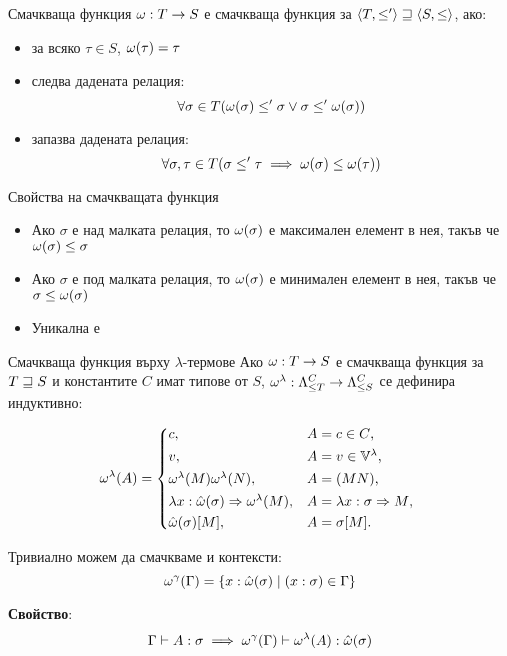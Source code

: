 \documentclass[9pt]{beamer}
\begin{document}
  \begin{frame}{Смачкваща функция}
    $\squash: T \fun S$ е смачкваща функция за
    $\lattice{ T}{ \less' } \tless \lattice{ S}{ \less }$, ако:
    \begin{itemize}
        \item за всяко $\tau \in S$, $\squash(\tau) = \tau$
        \item следва дадената релация:
            \[ \forall \sigma \in T
                (\squash(\sigma) \less' \sigma \lor \sigma \less' \squash(\sigma)) \]
        \item запазва дадената релация:
            \[ \forall \sigma, \tau \in T (\sigma \less' \tau \implies
                \squash(\sigma) \less \squash(\tau)) \]
    \end{itemize}
  \end{frame}

  \begin{frame}{Свойства на смачкващата функция}
    \begin{itemize}
      \item Ако $\sigma$ е над малката релация, то $\squash(\sigma)$ е максимален
        елемент в нея, такъв че $\squash(\sigma) \less \sigma$
      \item Ако $\sigma$ е под малката релация, то $\squash(\sigma)$ е минимален
        елемент в нея, такъв че $\sigma \less \squash(\sigma)$
      \item Уникална е
    \end{itemize}
  \end{frame}

  \begin{frame}{Смачкваща функция върху $\lambda$-термове}
    Ако $\squash: T \fun S$ е смачкваща функция за $T \tless S$ и
    константите $C$ имат типове от $S$,
    $\lsquash: \fancylambda{T}{C} \fun \fancylambda{S}{C}$
    се дефинира индуктивно:

    \[
        \lsquash(A) =
        \begin{cases*}
            c ,& $A = c \in C$, \\
            v ,& $A = v \in \lvars$, \\
            \lsquash(M) \lsquash(N) ,& $A = (MN)$, \\
            \lambda x : \tsquash(\sigma) \abstr \lsquash(M)
 ,& $A = \lambda x : \sigma \abstr M$, \\
                \tsquash(\sigma)[M] ,& $A = \sigma[M]$. \\
        \end{cases*}
    \]

    Тривиално можем да смачкваме и контексти:
    \[
        \consquash(\Gamma)
            = \{ x : \tsquash(\sigma) \mid (x : \sigma) \in \Gamma \}
    \]

    \textbf{Свойство}:
    \[ \Gamma \vdash A : \sigma \implies
        \consquash(\Gamma) \vdash \lsquash(A) : \tsquash(\sigma) \]
  \end{frame}
\end{document}
